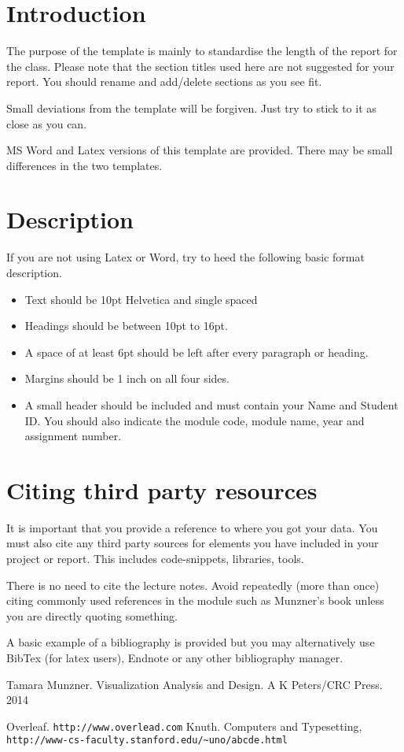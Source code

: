 \documentclass[a4paper, 10pt]{article}
\begin{document}
\section{Introduction}
The purpose of the template is mainly to standardise the length of the report for the class. Please note that the section titles used here are not suggested for your report. You should rename and add/delete sections as you see fit.

Small deviations from the template will be forgiven. Just try to stick to it as close as you can.

MS Word and Latex versions of this template are provided. There may be small differences in the two templates.

\section{Description}
If you are not using Latex or Word, try to heed the following basic format description.
\begin{itemize}
    \item Text should be 10pt Helvetica and single spaced
    \item Headings should be between 10pt to 16pt. 
    \item A space of at least 6pt should be left after every paragraph or heading.
    \item Margins should be 1 inch on all four sides. 
    \item A small header should be included and must contain your Name and Student ID. You should also indicate the module code, module name, year and assignment number. 
\end{itemize}

\section{Citing third party resources}
It is important that you provide a reference to where you got your data. You must also cite any third party sources for elements you have included in your project or report. This includes code-snippets, libraries, tools. 

There is no need to cite the lecture notes.  Avoid repeatedly (more than once) citing commonly used references in the module such as Munzner's book \cite{munzner} unless you are directly quoting something.

A basic example of a bibliography is provided but you may alternatively use BibTex (for latex users), Endnote or any other bibliography manager.


\begin{thebibliography}{9}
Tamara Munzner. Visualization Analysis and Design. A K Peters/CRC Press. 2014

Overleaf. 
\texttt{http://www.overlead.com}
Knuth. Computers and Typesetting,
\texttt{http://www-cs-faculty.stanford.edu/\~{}uno/abcde.html}
\end{thebibliography}
\end{document}
